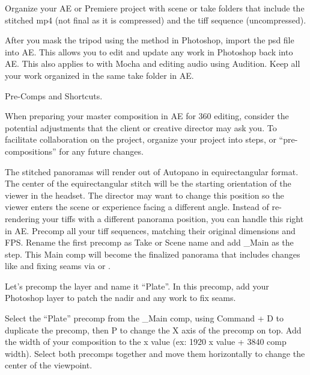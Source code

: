 \begin{fullwidth}
\clearpage
Organize your AE or Premiere project with scene or take folders that include the stitched mp4 (not final as it is compressed) and the tiff sequence (uncompressed). 


After you mask the tripod using the \textbf{} method in Photoshop, import the psd file into AE. This allows you to edit and update any work in Photoshop back into AE. This also applies to \textbf{} with Mocha and editing audio using Audition. Keep all your work organized in the same take folder in AE.

\clearpage
{\large Pre-Comps and Shortcuts. \par}

When preparing your master composition in AE for 360 editing, consider the potential adjustments that the client or creative director may ask you. To facilitate collaboration on the project, organize your project into steps, or “pre-compositions” for any future changes. 

The stitched panoramas will render out of Autopano in equirectangular format. The center of the equirectangular stitch will be the starting orientation of the viewer in the headset. The director may want to change this position so the viewer enters the scene or experience facing a different angle. Instead of re-rendering your tiffs with a different panorama position, you can handle this right in AE. Precomp all your tiff sequences, matching their original dimensions and FPS. Rename the first precomp as Take or Scene name and add \_Main as the step. This Main comp will become the finalized panorama that includes changes like \textbf{} and fixing seams via \textbf{} or \textbf{}. 

\clearpage
Let’s precomp the layer and name it “Plate”. In this precomp, add your Photoshop layer to patch the nadir and any work to fix seams. 



Select the “Plate” precomp from the \_Main comp, using Command + D to duplicate the precomp, then P to change the X axis of the precomp on top. Add the width of your composition to the x value (ex: 1920 x value + 3840 comp width). Select both precomps together and move them horizontally to change the center of the viewpoint.
\clearpage
{}


\end{fullwidth}
